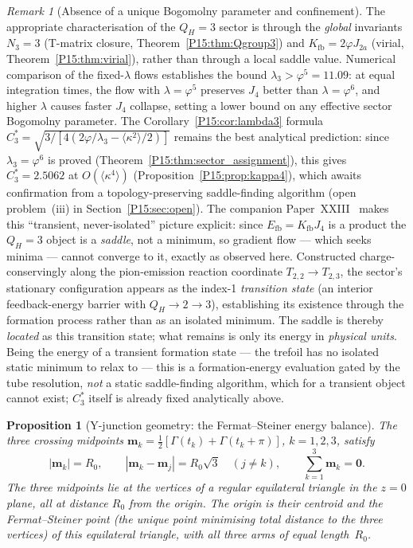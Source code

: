 \documentclass[11pt,a4paper]{article}
\newtheorem{proposition}[theorem]{Proposition}
\theoremstyle{definition}\newtheorem{definition}[theorem]{Definition}
\theoremstyle{remark}
\newtheorem{remark}[theorem]{Remark}
\newcommand{\vp}{\varphi}
\newcommand{\lam}{\lambda}
\newcommand{\Ja}{J_{2a}}
\newcommand{\Efb}{E_{\mathrm{fb}}}
\newcommand{\Kfb}{K_{\mathrm{fb}}}
\newcommand{\QH}{Q_H}
\begin{document}
\begin{remark}[Absence of a unique Bogomolny parameter and confinement]
The appropriate characterisation of the $\QH=3$ sector is through
the \emph{global} invariants $N_3=3$ (T-matrix closure,
Theorem~\ref{P15:thm:Qgroup3}) and $\Kfb=2\vp\Ja$ (virial,
Theorem~\ref{P15:thm:virial}), rather than through a local saddle value.
Numerical comparison of the fixed-$\lam$ flows establishes the
bound $\lam_3>\vp^5=11.09$: at equal integration times, the flow
with $\lam=\vp^5$ preserves $J_4$ better than $\lam=\vp^6$, and
higher $\lam$ causes faster $J_4$ collapse, setting a lower bound
on any effective sector Bogomolny parameter.
The Corollary~\ref{P15:cor:lambda3} formula $C_3^*=\sqrt{3/[4(2\vp/\lam_3
-\langle\kappa^2\rangle/2)]}$ remains the best analytical prediction:
since $\lam_3=\vp^6$ is proved (Theorem~\ref{P15:thm:sector_assignment}),
this gives $C_3^*=2.5062$ at $O(\langle\kappa^4\rangle)$
(Proposition~\ref{P15:prop:kappa4}), which
awaits confirmation from a topology-preserving saddle-finding
algorithm (open problem~(iii) in Section~\ref{P15:sec:open}).
The companion Paper~XXIII~\cite{Paper23} makes this ``transient, never-isolated''
picture explicit: since $\Efb=\Kfb J_4$ is a product the $\QH=3$ object is a
\emph{saddle}, not a minimum, so gradient flow --- which seeks minima ---
cannot converge to it, exactly as observed here. Constructed charge-conservingly
along the pion-emission reaction coordinate $T_{2,2}\!\to\!T_{2,3}$, the sector's
stationary configuration appears as the index-1 \emph{transition state} (an interior
feedback-energy barrier with $\QH\!\to\!2\!\to\!3$), establishing its existence through
the formation process rather than as an isolated minimum. The saddle is thereby
\emph{located} as this transition state; what remains is only its energy in
\emph{physical units}. Being the energy of a transient formation state --- the trefoil
has no isolated static minimum to relax to --- this is a formation-energy evaluation
gated by the tube resolution, \emph{not} a static saddle-finding algorithm, which for a
transient object cannot exist; $C_3^*$ itself is already fixed analytically above.
\end{remark}

\begin{proposition}[Y-junction geometry: the Fermat--Steiner energy balance]
\label{P15:prop:yjunction}
The three crossing midpoints
$\mathbf{m}_k = \tfrac{1}{2}[\Gamma(t_k)+\Gamma(t_k+\pi)]$,
$k=1,2,3$, satisfy
\begin{equation}
  |\mathbf{m}_k| = R_0,\qquad
  |\mathbf{m}_k - \mathbf{m}_j| = R_0\sqrt{3}\quad(j\neq k),\qquad
  \sum_{k=1}^3 \mathbf{m}_k = \mathbf{0}.
  \label{P15:eq:yjunction}
\end{equation}
The three midpoints lie at the vertices of a regular equilateral
triangle in the $z=0$ plane, all at distance $R_0$ from the origin.
The origin is their centroid and the Fermat--Steiner point (the
unique point minimising total distance to the three vertices) of
this equilateral triangle, with all three arms of equal length~$R_0$.
\end{proposition}
\end{document}
